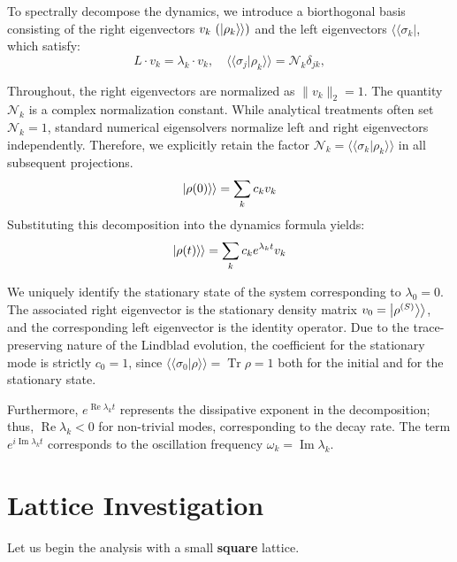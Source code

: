 \documentclass[pdflatex,sn-mathphys-num]{sn-jnl}
\renewcommand{\textcolor}[2]{#2}
\newcommand{\ketket}[1]{\left| #1 \right\rangle \! \mathclose{\left. \vphantom{#1} \right\rangle}}
\begin{document}
To spectrally decompose the dynamics, we introduce a biorthogonal basis consisting of the right eigenvectors $v_k \ (\ketket{\rho_k})$ and the left eigenvectors $\langle\langle\sigma_k |$, which satisfy:
\begin{equation}
L\cdot v_k = \lambda_k \cdot v_k,
\quad
\langle\langle \sigma_j | \rho_k\rangle\rangle = \mathcal{N}_k \delta_{jk},
\label{eq:eig_1}
\end{equation}

\textcolor{green}{Throughout, the right eigenvectors are normalized as $\lVert v_k\rVert_2=1$. The quantity $\mathcal{N}_k$ is a complex normalization constant. While analytical treatments often set $\mathcal{N}_k = 1$, standard numerical eigensolvers normalize left and right eigenvectors independently. Therefore, we explicitly retain the factor $\mathcal{N}_k = \langle\langle\sigma_k | \rho_k\rangle\rangle$ in all subsequent projections.}
\begin{equation}
\ketket{\rho(0)}=\sum_k c_k v_k
\label{eq:eig_decomp_0}
\end{equation}
Substituting this decomposition into the dynamics formula yields:
\begin{equation}
\ketket{\rho(t)}=\sum_kc_ke^{\lambda_k t }v_k
\label{eq:eig_decomp}
\end{equation}

{We uniquely identify the stationary state of the system corresponding to $\lambda_0=0$. The associated right eigenvector is the stationary density matrix $v_0 = \ketket{\rho^{(S)}}$, and the corresponding left eigenvector is the identity operator. Due to the trace-preserving nature of the Lindblad evolution, the coefficient for the stationary mode is strictly $c_0 = 1$, since $\langle\langle\sigma_0|\rho\rangle\rangle = \operatorname{Tr}\rho = 1$ both for the initial and for the stationary state. }


Furthermore, $e^{\operatorname{Re}\lambda_k t}$ represents the dissipative exponent in the decomposition; thus, $\operatorname{Re}\lambda_k < 0$ for non-trivial modes, corresponding to the decay rate. The term $e^{i\operatorname{Im}\lambda_k t}$ corresponds to the oscillation frequency $\omega_k = \operatorname{Im}\lambda_k$. \cite{kessler2012, minganti2018}

\section{Lattice Investigation}
Let us begin the analysis with a small \textbf{square} lattice.\
\end{document}

